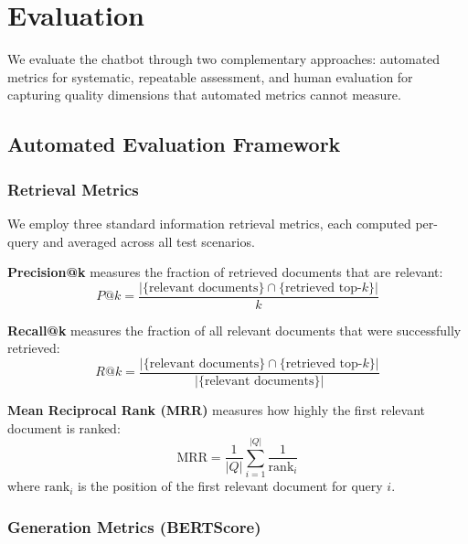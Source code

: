\documentclass[12pt, a4paper]{article}
\begin{document}
\section{Evaluation}
\label{sec:evaluation}

We evaluate the chatbot through two complementary approaches: automated
metrics for systematic, repeatable assessment, and human evaluation for
capturing quality dimensions that automated metrics cannot measure.

\subsection{Automated Evaluation Framework}

\subsubsection{Retrieval Metrics}

We employ three standard information retrieval metrics, each computed
per-query and averaged across all test scenarios.

\textbf{Precision@k} measures the fraction of retrieved documents that are
relevant:
\begin{equation}
  P@k = \frac{|\{\text{relevant documents}\} \cap \{\text{retrieved top-}k\}|}{k}
  \label{eq:precision}
\end{equation}

\textbf{Recall@k} measures the fraction of all relevant documents that
were successfully retrieved:
\begin{equation}
  R@k = \frac{|\{\text{relevant documents}\} \cap \{\text{retrieved top-}k\}|}{|\{\text{relevant documents}\}|}
  \label{eq:recall}
\end{equation}

\textbf{Mean Reciprocal Rank (MRR)} measures how highly the first relevant
document is ranked:
\begin{equation}
  \text{MRR} = \frac{1}{|Q|} \sum_{i=1}^{|Q|} \frac{1}{\text{rank}_i}
  \label{eq:mrr}
\end{equation}
where $\text{rank}_i$ is the position of the first relevant document for
query $i$.

\subsubsection{Generation Metrics (BERTScore)}
\end{document}
